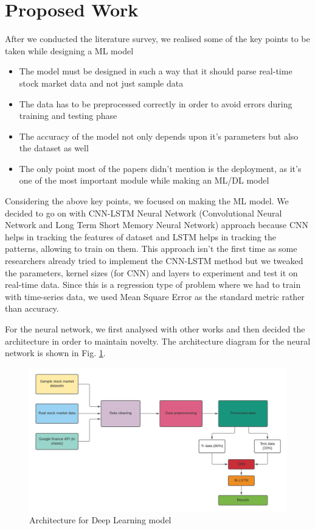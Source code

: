 \documentclass[conference]{IEEEtran}
\begin{document}
\section{Proposed Work}
After we conducted the literature survey, we realised some of the key points to be taken while designing a ML model
\begin{itemize}
\item The model must be designed in such a way that it should parse real-time stock market data and not just sample data
\item The data has to be preprocessed correctly in order to avoid errors during training and testing phase
\item The accuracy of the model not only depends upon it's parameters but also the dataset as well
\item The only point most of the papers didn't mention is the deployment, as it's one of the most important module while making an ML/DL model
\end{itemize}
Considering the above key points, we focused on making the ML model. We decided to go on with CNN-LSTM Neural Network (Convolutional Neural Network and Long Term Short Memory Neural Network) approach because CNN helps in tracking the features of dataset and LSTM helps in tracking the patterns, allowing to train on them. This approach isn't the first time as some researchers already tried to implement the CNN-LSTM method but we tweaked the parameters, kernel sizes (for CNN) and layers to experiment and test it on real-time data. Since this is a regression type of problem where we had to train with time-series data, we used Mean Square Error as the standard metric rather than accuracy.

For the neural network, we first analysed with other works and then decided the architecture in order to maintain novelty. The architecture diagram for the neural network is shown in Fig. \ref{model-sam}.

\begin{figure}[htbp]
\centerline{\includegraphics[scale=0.3]{SI - Arch.png}}
\caption{Architecture for Deep Learning model}
\label{model-sam}
\end{figure}
\end{document}
